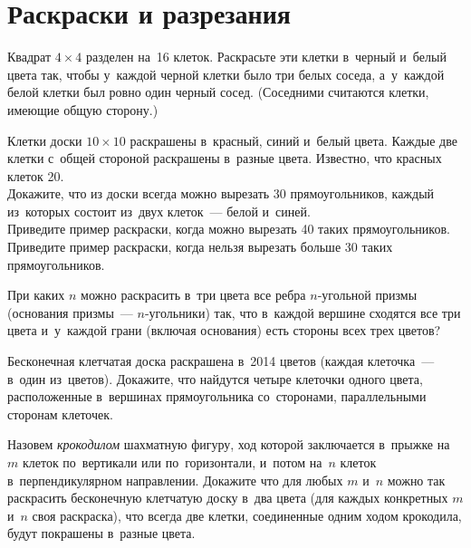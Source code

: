 
\section*{Раскраски и разрезания}



\begin{problems}

\item
Квадрат $4 \times 4$ разделен на~16 клеток.
Раскрасьте эти клетки в~черный и~белый цвета так, чтобы у~каждой черной клетки
было три белых соседа, а~у~каждой белой клетки был ровно один черный сосед.
(Соседними считаются клетки, имеющие общую сторону.)

\item
Клетки доски $10 \times 10$ раскрашены в~красный, синий и~белый цвета.
Каждые две клетки с~общей стороной раскрашены в~разные цвета.
Известно, что красных клеток 20.
\\
\sp Докажите, что из доски всегда можно вырезать 30 прямоугольников, каждый
из~которых состоит из~двух клеток~--- белой и~синей.
\\
\sp Приведите пример раскраски, когда можно вырезать 40 таких прямоугольников.
\\
\sp Приведите пример раскраски, когда нельзя вырезать больше 30 таких
прямоугольников.

\item
При каких $n$ можно раскрасить в~три цвета все ребра $n$-угольной призмы
(основания призмы~--- $n$-угольники) так, что в~каждой вершине сходятся все
три цвета и~у~каждой грани (включая основания) есть стороны всех трех цветов?

\item
Бесконечная клетчатая доска раскрашена в~2014 цветов
(каждая клеточка~--- в~один из~цветов).
Докажите, что найдутся четыре клеточки одного цвета, расположенные в~вершинах
прямоугольника со~сторонами, параллельными сторонам клеточек.

\item
Назовем \emph{крокодилом} шахматную фигуру, ход которой заключается в~прыжке
на~$m$ клеток по~вертикали или по~горизонтали, и~потом на~$n$ клеток
в~перпендикулярном направлении.
Докажите что для любых $m$ и~$n$ можно так раскрасить бесконечную клетчатую
доску в~два цвета (для каждых конкретных $m$ и~$n$ своя раскраска), что всегда
две клетки, соединенные одним ходом крокодила, будут покрашены в~разные цвета.


\end{problems}
